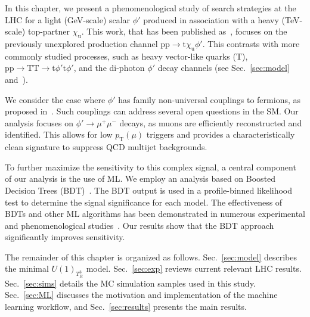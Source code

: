 In this chapter, we present a phenomenological study of search strategies at the LHC for a light (GeV-scale) scalar $\phi'$ produced in association with a heavy (TeV-scale) top-partner $\chi_\mathrm{u}$. This work, that  has been published as~\parencite{Qureshi:2024naw}, focuses on the previously unexplored production channel $\mathrm{pp}\to \mathrm{t}\chi_\mathrm{u}\phi'$. This contrasts with more commonly studied processes, such as heavy vector-like quarks (T), $\mathrm{pp}\to \mathrm{T}\mathrm{T}\to \mathrm{t}\phi'\mathrm{t}\phi'$, and the di-photon $\phi'$ decay channels (see Sec.~\ref{sec:model} and~\parencite{Bhardwaj_2022, Bhardwaj_2022_2, Bardhan_2023, Banerjee_2016, Alves_2024}).

We consider the case where $\phi'$ has family non-universal couplings to fermions, as proposed in~\parencite{Dutta2020}. Such couplings can address several open questions in the SM. Our analysis focuses on $\phi'\to\mu^+\mu^-$ decays, as muons are efficiently reconstructed and identified. This allows for low $p_{\mathrm{T}}(\mu)$ triggers and provides a characteristically clean signature to suppress QCD multijet backgrounds.

To further maximize the sensitivity to this complex signal, a central component of our analysis is the use of ML. We employ an analysis based on Boosted Decision Trees (BDT)~\parencite{friedman_greedy_2001}. The BDT output is used in a profile-binned likelihood test to determine the signal significance for each model. The effectiveness of BDTs and other ML algorithms has been demonstrated in numerous experimental and phenomenological studies~\parencite{Ai:2022qvs, ATLAS:2017fak, Biswas:2018snp, Chung:2020ysf, Feng:2021eke, ttZprime, Chigusa:2022svv, Arganda2024, Ajmal_2024, Dutta_2015}. Our results show that the BDT approach significantly improves sensitivity.


The remainder of this chapter is organized as follows. Sec.~\ref{sec:model} describes the minimal $U(1)_{T^3_R}$ model. Sec.~\ref{sec:exp} reviews current relevant LHC results. Sec.~\ref{sec:sims} details the MC simulation samples used in this study. Sec.~\ref{sec:ML} discusses the motivation and implementation of the machine learning workflow, and Sec.~\ref{sec:results} presents the main results.






